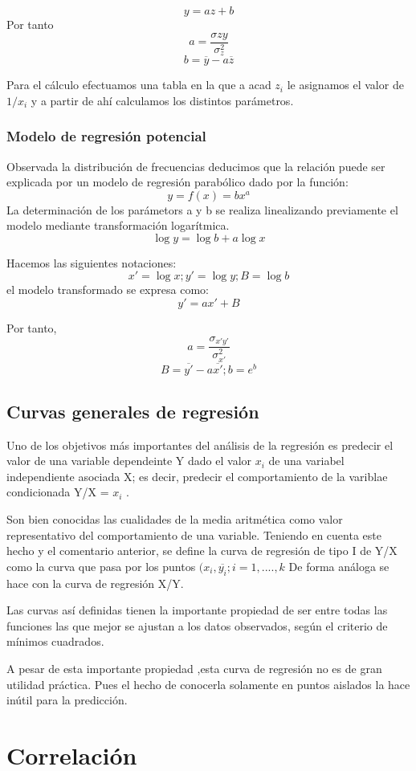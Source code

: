 \documentclass{article}
\begin{document}
$$ y = az +b $$
Por tanto $$ a = \frac{\sigma{zy} }{\sigma_{z}^2} $$ 
$$ b = \overline{y} - a \overline{z} $$

Para el cálculo efectuamos una tabla en la que a acad $z_i$ le asignamos el valor de $1/x_i$ y a partir de ahí calculamos los distintos parámetros.

\subsubsection{Modelo de regresión potencial}
	Observada la distribución de frecuencias deducimos que la relación puede ser explicada por un modelo de regresión parabólico dado por la función:
$$ y = f(x) = bx^a $$
	La determinación de los parámetors a y b se realiza linealizando previamente el modelo mediante transformación logarítmica.
	$$ \log y = \log b + a\log x $$
	
	Hacemos las siguientes notaciones:
$$x' = \log x; y' = \log y ; B = \log b $$
	el modelo transformado se expresa como:
$$y' = ax' + B $$
	
	Por tanto,
	$$ a = \frac{\sigma_{x'y'} }{\sigma_{x'}^2}$$
	$$ B = \overline{y'} - a\overline{x'} ; b = e^{b} $$

\subsection{Curvas generales de regresión}
Uno de los objetivos más importantes del análisis de la regresión es predecir el valor de una variable dependeinte Y dado el valor $x_i$ de una variabel independiente asociada X;  es decir, predecir el comportamiento de la variblae condicionada Y/X = $x_i$ .

Son bien conocidas las cualidades de la media aritmética como valor representativo del comportamiento de una variable. Teniendo en cuenta este hecho y el comentario anterior, se define la curva de regresión de tipo I de Y/X como la curva que pasa por los puntos $(x_i,\overline{y_i}; i = 1,....,k $ De forma análoga se hace con la curva de regresión X/Y.

Las curvas así definidas tienen la importante propiedad de ser entre todas las funciones las que mejor se ajustan a los datos observados, según el criterio de mínimos cuadrados.

A pesar de esta importante propiedad ,esta curva de regresión no es de gran utilidad práctica. Pues el hecho de conocerla solamente en puntos aislados la hace inútil para la predicción.


\section{Correlación}
\end{document}
